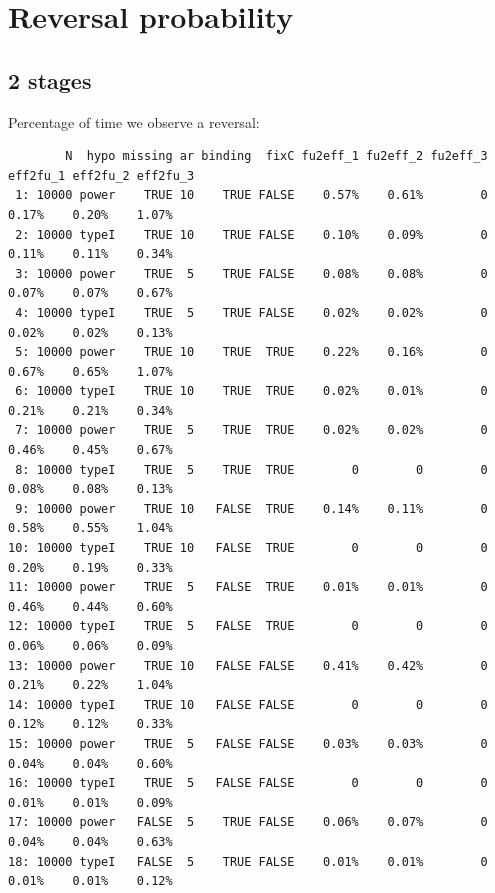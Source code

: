\documentclass[12pt]{article}
\begin{document}
\clearpage

\section{Reversal probability}
\label{sec:orgbe1e161}

\subsection{2 stages}
\label{sec:orgab3a261}

Percentage of time we observe a reversal:

\begin{verbatim}
        N  hypo missing ar binding  fixC fu2eff_1 fu2eff_2 fu2eff_3 eff2fu_1 eff2fu_2 eff2fu_3
 1: 10000 power    TRUE 10    TRUE FALSE    0.57%    0.61%        0    0.17%    0.20%    1.07%
 2: 10000 typeI    TRUE 10    TRUE FALSE    0.10%    0.09%        0    0.11%    0.11%    0.34%
 3: 10000 power    TRUE  5    TRUE FALSE    0.08%    0.08%        0    0.07%    0.07%    0.67%
 4: 10000 typeI    TRUE  5    TRUE FALSE    0.02%    0.02%        0    0.02%    0.02%    0.13%
 5: 10000 power    TRUE 10    TRUE  TRUE    0.22%    0.16%        0    0.67%    0.65%    1.07%
 6: 10000 typeI    TRUE 10    TRUE  TRUE    0.02%    0.01%        0    0.21%    0.21%    0.34%
 7: 10000 power    TRUE  5    TRUE  TRUE    0.02%    0.02%        0    0.46%    0.45%    0.67%
 8: 10000 typeI    TRUE  5    TRUE  TRUE        0        0        0    0.08%    0.08%    0.13%
 9: 10000 power    TRUE 10   FALSE  TRUE    0.14%    0.11%        0    0.58%    0.55%    1.04%
10: 10000 typeI    TRUE 10   FALSE  TRUE        0        0        0    0.20%    0.19%    0.33%
11: 10000 power    TRUE  5   FALSE  TRUE    0.01%    0.01%        0    0.46%    0.44%    0.60%
12: 10000 typeI    TRUE  5   FALSE  TRUE        0        0        0    0.06%    0.06%    0.09%
13: 10000 power    TRUE 10   FALSE FALSE    0.41%    0.42%        0    0.21%    0.22%    1.04%
14: 10000 typeI    TRUE 10   FALSE FALSE        0        0        0    0.12%    0.12%    0.33%
15: 10000 power    TRUE  5   FALSE FALSE    0.03%    0.03%        0    0.04%    0.04%    0.60%
16: 10000 typeI    TRUE  5   FALSE FALSE        0        0        0    0.01%    0.01%    0.09%
17: 10000 power   FALSE  5    TRUE FALSE    0.06%    0.07%        0    0.04%    0.04%    0.63%
18: 10000 typeI   FALSE  5    TRUE FALSE    0.01%    0.01%        0    0.01%    0.01%    0.12%
\end{verbatim}

\clearpage
\end{document}
